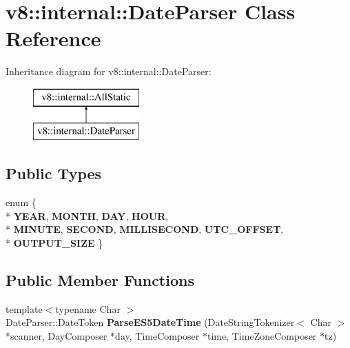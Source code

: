 \hypertarget{classv8_1_1internal_1_1_date_parser}{}\section{v8\+:\+:internal\+:\+:Date\+Parser Class Reference}
\label{classv8_1_1internal_1_1_date_parser}
Inheritance diagram for v8\+:\+:internal\+:\+:Date\+Parser\+:\begin{figure}[H]
\begin{center}
\leavevmode
\includegraphics[height=2.000000cm]{classv8_1_1internal_1_1_date_parser}
\end{center}
\end{figure}
\subsection*{Public Types}
\begin{DoxyCompactItemize}
\item 
\hypertarget{classv8_1_1internal_1_1_date_parser_aa133e11fd2394383984417e863f4b1ef}{}enum \{ \\*
{\bfseries Y\+E\+A\+R}, 
{\bfseries M\+O\+N\+T\+H}, 
{\bfseries D\+A\+Y}, 
{\bfseries H\+O\+U\+R}, 
\\*
{\bfseries M\+I\+N\+U\+T\+E}, 
{\bfseries S\+E\+C\+O\+N\+D}, 
{\bfseries M\+I\+L\+L\+I\+S\+E\+C\+O\+N\+D}, 
{\bfseries U\+T\+C\+\_\+\+O\+F\+F\+S\+E\+T}, 
\\*
{\bfseries O\+U\+T\+P\+U\+T\+\_\+\+S\+I\+Z\+E}
 \}\label{classv8_1_1internal_1_1_date_parser_aa133e11fd2394383984417e863f4b1ef}

\end{DoxyCompactItemize}
\subsection*{Public Member Functions}
\begin{DoxyCompactItemize}
\item 
\hypertarget{classv8_1_1internal_1_1_date_parser_a702f10e026bf1779606ac1ad4846c571}{}{\footnotesize template$<$typename Char $>$ }\\Date\+Parser\+::\+Date\+Token {\bfseries Parse\+E\+S5\+Date\+Time} (Date\+String\+Tokenizer$<$ Char $>$ $\ast$scanner, Day\+Composer $\ast$day, Time\+Composer $\ast$time, Time\+Zone\+Composer $\ast$tz)\label{classv8_1_1internal_1_1_date_parser_a702f10e026bf1779606ac1ad4846c571}

\end{DoxyCompactItemize}
